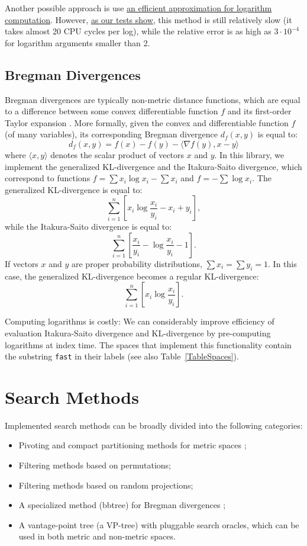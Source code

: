 \documentclass[runningheads,a4paper]{llncs}
\newcommand{\ttt}[1]{\texttt{#1}}
\begin{document}
Another possible approach is use \href{http://fastapprox.googlecode.com/svn/trunk/fastapprox/src/fastonebigheader.h}{an efficient approximation for logarithm computation}.
However, \href{https://github.com/searchivarius/BlogCode/tree/master/2013/12/26}{as our tests show},
this method is still relatively slow (it takes almost 20 CPU cycles per log),
 while the relative error is as high as $3 \cdot 10^{-4}$ for logarithm arguments smaller than 2.

\subsection{Bregman Divergences}\label{SectionBregman}
Bregman divergences are typically non-metric distance functions,
which are equal to a difference between some convex differentiable function $f$
and its first-order Taylor expansion \cite{Bregman:1967,Cayton:2008}. 
More formally, given the convex and differentiable function $f$
(of many variables), its
corresponding Bregman divergence $d_f(x,y)$ is equal to:
$$
d_f(x,y) = f(x) - f(y) - \langle\nabla f(y), x - y \rangle
$$
where $\langle x,y\rangle$ denotes the scalar product of vectors $x$ and $y$.
In this library, we implement the generalized KL-divergence 
and the Itakura-Saito divergence,
which correspond to functions $f=\sum x_i \log x_i - \sum x_i$ and $f = - \sum \log x_i$. 
The generalized KL-divergence is equal to:
$$
\sum_{i=1}^n \left[  x_i \log \frac{x_i}{y_i} -   x_i +   y_i \right],
$$
while the Itakura-Saito divergence is equal to:
$$ 
\sum_{i=1}^n \left[ \frac{ x_i}{y_i} - \log \frac{x_i}{y_i}  -1 \right].
$$
If vectors $x$ and $y$ are proper probability distributions, $\sum x_i = \sum y_i = 1$.
In this case, the generalized KL-divergence becomes a regular KL-divergence:
$$
\sum_{i=1}^n \left[  x_i \log \frac{x_i}{y_i} \right].
$$

Computing logarithms is costly: We can considerably improve efficiency of 
evaluation Itakura-Saito divergence and KL-divergence by pre-computing logarithms at index time.
The spaces that implement this functionality contain the substring \ttt{fast} in their labels (see also Table~\ref{TableSpaces}).


\section{Search Methods}\label{SectionMethods}
Implemented search methods can be broadly divided into the following 
categories:
\begin{itemize}
\item Pivoting and compact partitioning methods for metric spaces \cite{Chavez_et_al:2001a};
\item Filtering methods based on permutations;
\item Filtering methods based on random projections;
\item A specialized method (bbtree) for Bregman divergences \cite{Cayton:2008};
\item A vantage-point tree (a VP-tree) with pluggable search oracles, 
which can be used in both metric and non-metric spaces.
\end{itemize}
\end{document}
